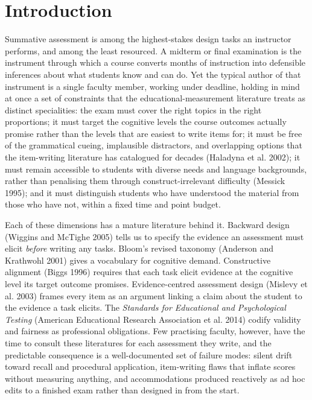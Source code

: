 \documentclass[
  11pt,
  letterpaper,
]{article}
\begin{document}
\section{Introduction}\label{introduction}

Summative assessment is among the highest-stakes design tasks an
instructor performs, and among the least resourced. A midterm or final
examination is the instrument through which a course converts months of
instruction into defensible inferences about what students know and can
do. Yet the typical author of that instrument is a single faculty
member, working under deadline, holding in mind at once a set of
constraints that the educational-measurement literature treats as
distinct specialities: the exam must cover the right topics in the right
proportions; it must target the cognitive levels the course outcomes
actually promise rather than the levels that are easiest to write items
for; it must be free of the grammatical cueing, implausible distractors,
and overlapping options that the item-writing literature has catalogued
for decades (Haladyna et al. 2002); it must remain accessible to
students with diverse needs and language backgrounds, rather than
penalising them through construct-irrelevant difficulty (Messick 1995);
and it must distinguish students who have understood the material from
those who have not, within a fixed time and point budget.

Each of these dimensions has a mature literature behind it. Backward
design (Wiggins and McTighe 2005) tells us to specify the evidence an
assessment must elicit \emph{before} writing any tasks. Bloom's revised
taxonomy (Anderson and Krathwohl 2001) gives a vocabulary for cognitive
demand. Constructive alignment (Biggs 1996) requires that each task
elicit evidence at the cognitive level its target outcome promises.
Evidence-centred assessment design (Mislevy et al. 2003) frames every
item as an argument linking a claim about the student to the evidence a
task elicits. The \emph{Standards for Educational and Psychological
Testing} (American Educational Research Association et al. 2014) codify
validity and fairness as professional obligations. Few practising
faculty, however, have the time to consult these literatures for each
assessment they write, and the predictable consequence is a
well-documented set of failure modes: silent drift toward recall and
procedural application, item-writing flaws that inflate scores without
measuring anything, and accommodations produced reactively as ad hoc
edits to a finished exam rather than designed in from the start.
\end{document}
